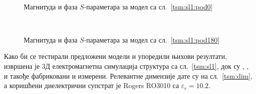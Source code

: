 \begin{figure}[!t]
\centering
{}\\
\caption{Магнитуда и фаза $S$-параметара за модел са сл.~\ref{tsm:sl1:pod0}}
\label{tsm:rez1c:pod0}
\end{figure}
\begin{figure}[!t]
\centering
{}\\
\caption{Магнитуда и фаза $S$-параметара за модел са сл.~\ref{tsm:sl1:pod180}}
\label{tsm:rez1c:pod180}
\end{figure}
Како би се тестирали предложени модели и упоредили њихови резултати, извршена је 3Д електромагнетна симулација структура са сл.~\ref{tsm:sl1}, док су , ,  и  такође фабриковани и измерени. Релевантне димензије дате су на сл.~\ref{tsm:dim}, а коришћени диелектрични супстрат је Rogers RO3010 са $\varepsilon_r = \num{10.2}$. 

